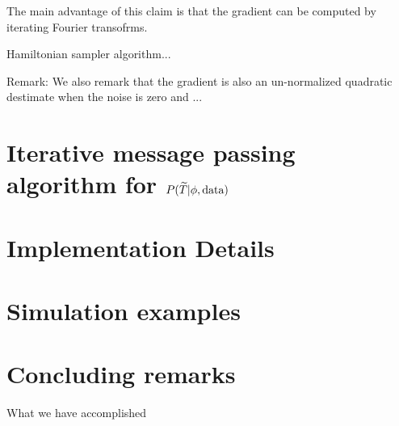 \documentclass[noinfoline]{imsart}
\begin{document}
The main advantage of this claim is that the gradient can be computed by iterating Fourier transofrms.

Hamiltonian sampler algorithm...

{\rm Remark:}
We also remark that the gradient is also an un-normalized quadratic destimate when the noise is zero and ...











%
%
\section{Iterative message passing algorithm for $ P(\widetilde T |  \phi,\text{\rm data})$}
\label{Section: iterative message passing section}





%
%
\section{Implementation Details}
\label{Section: Implementation Details}







%
%
\section{Simulation examples}
\label{Section: simulation examples}



%
%
\section{Concluding remarks}

What we have accomplished
\end{document}
